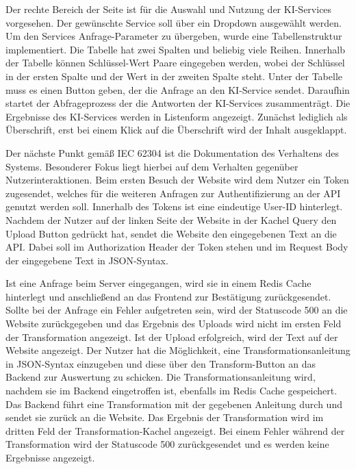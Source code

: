Der rechte Bereich der Seite ist für die Auswahl und Nutzung der KI-Services vorgesehen. Der gewünschte Service soll über ein Dropdown ausgewählt werden. Um den Services Anfrage-Parameter zu übergeben, wurde eine Tabellenstruktur implementiert. Die Tabelle hat zwei Spalten und beliebig viele Reihen. Innerhalb der Tabelle können Schlüssel-Wert Paare eingegeben werden, wobei der Schlüssel in der ersten Spalte und der Wert in der zweiten Spalte steht. Unter der Tabelle muss es einen Button geben, der die Anfrage an den KI-Service sendet. Daraufhin startet der Abfrageprozess der die Antworten der KI-Services zusammenträgt. Die Ergebnisse des KI-Services werden in Listenform angezeigt. Zunächst lediglich als Überschrift, erst bei einem Klick auf die Überschrift wird der Inhalt ausgeklappt.

Der nächste Punkt gemäß IEC 62304 ist die Dokumentation des Verhaltens des Systems. Besonderer Fokus liegt hierbei auf dem Verhalten gegenüber Nutzerinteraktionen. Beim ersten Besuch der Website wird dem Nutzer ein Token zugesendet, welches für die weiteren Anfragen zur Authentifizierung an der API genutzt werden soll. Innerhalb des Tokens ist eine eindeutige User-ID hinterlegt. Nachdem der Nutzer auf der linken Seite der Website in der Kachel \glqq Query\grqq{} den Upload Button gedrückt hat, sendet die Website den eingegebenen Text an die API. Dabei soll im Authorization Header der Token stehen und im Request Body der eingegebene Text in JSON-Syntax. 

Ist eine Anfrage beim Server eingegangen, wird sie in einem Redis Cache hinterlegt und anschließend an das Frontend zur Bestätigung zurückgesendet. Sollte bei der Anfrage ein Fehler aufgetreten sein, wird der Statuscode 500 an die Website zurückgegeben und das Ergebnis des Uploads wird nicht im ersten Feld der Transformation angezeigt. Ist der Upload erfolgreich, wird der Text auf der Website angezeigt. Der Nutzer hat die Möglichkeit, eine Transformationsanleitung in JSON-Syntax einzugeben und diese über den Transform-Button an das Backend zur Auswertung zu schicken. Die Transformationsanleitung wird, nachdem sie im Backend eingetroffen ist, ebenfalls im Redis Cache gespeichert. Das Backend führt eine Transformation mit der gegebenen Anleitung durch und sendet sie zurück an die Website. Das Ergebnis der Transformation wird im dritten Feld der Transformation-Kachel angezeigt. Bei einem Fehler während der Transformation wird der Statuscode 500 zurückgesendet und es werden keine Ergebnisse angezeigt.

